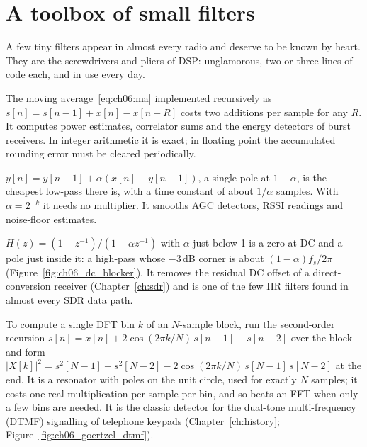 
\section{A toolbox of small filters}
\label{sec:ch06:toolbox}

A few tiny filters appear in almost every radio and deserve to be known by heart. They are the
screwdrivers and pliers of DSP: unglamorous, two or three lines of code each, and in use every day.
\begin{description}[style=nextline,leftmargin=1.2em,font=\sffamily\bfseries\small\color{navy}]
\item[The running sum.] The moving average~\eqref{eq:ch06:ma} implemented recursively as
$s[n]=s[n-1]+x[n]-x[n-R]$ costs two additions per sample for any $R$. It computes power estimates,
correlator sums and the energy detectors of burst receivers. In integer arithmetic it is exact; in
floating point the accumulated rounding error must be cleared periodically.
\item[The exponential averager.] $y[n]=y[n-1]+\alpha(x[n]-y[n-1])$, a single pole at $1-\alpha$, is the
cheapest low-pass there is, with a time constant of about $1/\alpha$ samples. With $\alpha=2^{-k}$ it
needs no multiplier. It smooths AGC detectors, RSSI readings and noise-floor estimates.
\item[The DC blocker.] $H(z)=(1-z^{-1})/(1-\alpha z^{-1})$ with $\alpha$ just below 1 is a zero at DC and
a pole just inside it: a high-pass whose $-3$\,dB corner is about $(1-\alpha)f_s/2\pi$
(Figure~\ref{fig:ch06_dc_blocker}). It removes the residual DC offset of a direct-conversion receiver
(Chapter~\ref{ch:sdr}) and is one of the few IIR filters found in almost every SDR data path.
\item[The Goertzel algorithm.] To compute a single DFT bin $k$ of an $N$-sample block, run the
second-order recursion $s[n]=x[n]+2\cos(2\pi k/N)\,s[n-1]-s[n-2]$ over the block and form
$|X[k]|^2=s^2[N-1]+s^2[N-2]-2\cos(2\pi k/N)\,s[N-1]\,s[N-2]$ at the end. It is a resonator with poles on the unit circle,
used for exactly $N$ samples; it costs one real multiplication per sample per bin, and so beats
an FFT when only a few bins are needed. It is the classic detector for the dual-tone multi-frequency
(DTMF) signalling of telephone keypads (Chapter~\ref{ch:history}; Figure~\ref{fig:ch06_goertzel_dtmf}).
\end{description}

